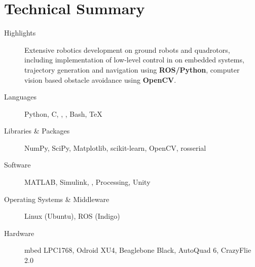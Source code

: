 \documentclass{simplecv}
\begin{document}
\maketitle
\vfill
\section{Technical Summary}
\begin{minipage}{\textwidth}
\begin{description}
    \item[Highlights]
        Extensive robotics development on ground robots and quadrotors, including implementation of low-level control in \textbf{\CPP} on embedded systems, trajectory generation and navigation using \textbf{ROS/Python}, computer vision based obstacle avoidance using \textbf{OpenCV}. 
\item[Languages]
    Python,
    C,
    \CPP,
    \CSharp,
    Bash,
    \TeX

\item[Libraries \& Packages]
    NumPy,
    SciPy,
    Matplotlib,
    scikit-learn,
    OpenCV,
    rosserial

\item[Software]
    MATLAB,
  Simulink,
  ,
  Processing,
  Unity

\item[Operating Systems \& Middleware]
    Linux (Ubuntu),
    ROS (Indigo)
\item[Hardware]
    mbed LPC1768,
    Odroid XU4,
    Beaglebone Black,
    AutoQuad 6,
    CrazyFlie 2.0
\end{description}
\end{minipage}

\vfill
\end{document}
